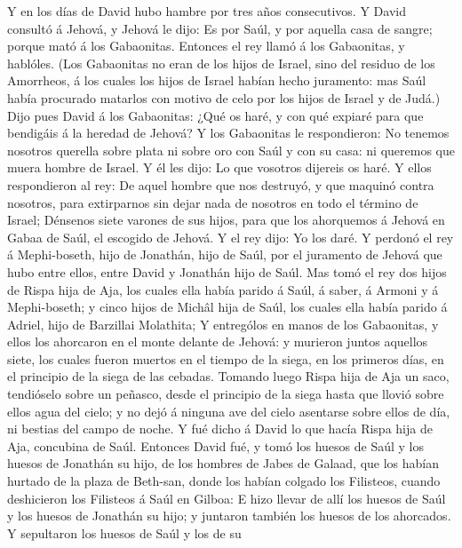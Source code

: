  Y en los días de David hubo hambre por tres años
consecutivos. Y David consultó á Jehová, y Jehová le dijo: Es por Saúl,
y por aquella casa de sangre; porque mató á los Gabaonitas.
 Entonces el rey llamó á los Gabaonitas, y hablóles. (Los
Gabaonitas no eran de los hijos de Israel, sino del residuo de los
Amorrheos, á los cuales los hijos de Israel habían hecho juramento: mas
Saúl había procurado matarlos con motivo de celo por los hijos de Israel
y de Judá.)  Dijo pues David á los Gabaonitas: ¿Qué os
haré, y con qué expiaré para que bendigáis á la heredad de Jehová?
 Y los Gabaonitas le respondieron: No tenemos nosotros
querella sobre plata ni sobre oro con Saúl y con su casa: ni queremos
que muera hombre de Israel. Y él les dijo: Lo que vosotros dijereis os
haré.  Y ellos respondieron al rey: De aquel hombre que
nos destruyó, y que maquinó contra nosotros, para extirparnos sin dejar
nada de nosotros en todo el término de Israel;  Dénsenos
siete varones de sus hijos, para que los ahorquemos á Jehová en Gabaa de
Saúl, el escogido de Jehová. Y el rey dijo: Yo los daré. 
Y perdonó el rey á Mephi-boseth, hijo de Jonathán, hijo de Saúl, por el
juramento de Jehová que hubo entre ellos, entre David y Jonathán hijo de
Saúl.  Mas tomó el rey dos hijos de Rispa hija de Aja, los
cuales ella había parido á Saúl, á saber, á Armoni y á Mephi-boseth; y
cinco hijos de Michâl hija de Saúl, los cuales ella había parido á
Adriel, hijo de Barzillai Molathita;  Y entrególos en
manos de los Gabaonitas, y ellos los ahorcaron en el monte delante de
Jehová: y murieron juntos aquellos siete, los cuales fueron muertos en
el tiempo de la siega, en los primeros días, en el principio de la siega
de las cebadas.  Tomando luego Rispa hija de Aja un saco,
tendióselo sobre un peñasco, desde el principio de la siega hasta que
llovió sobre ellos agua del cielo; y no dejó á ninguna ave del cielo
asentarse sobre ellos de día, ni bestias del campo de noche.
 Y fué dicho á David lo que hacía Rispa hija de Aja,
concubina de Saúl.  Entonces David fué, y tomó los huesos
de Saúl y los huesos de Jonathán su hijo, de los hombres de Jabes de
Galaad, que los habían hurtado de la plaza de Beth-san, donde los habían
colgado los Filisteos, cuando deshicieron los Filisteos á Saúl en
Gilboa:  E hizo llevar de allí los huesos de Saúl y los
huesos de Jonathán su hijo; y juntaron también los huesos de los
ahorcados.  Y sepultaron los huesos de Saúl y los de su
